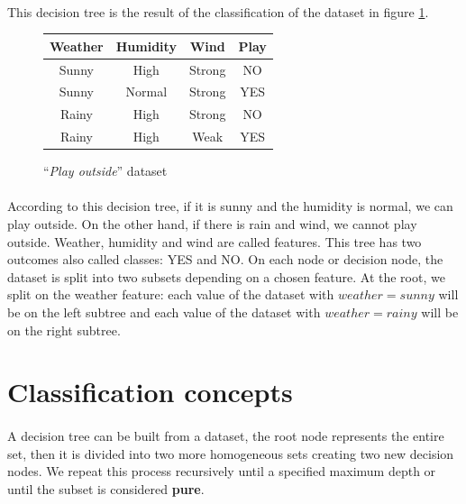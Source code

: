 \documentclass[12pt]{report}
\theoremstyle{definition}
\theoremstyle{definition}
\theoremstyle{definition}
\begin{document}
\paragraph{} This decision tree is the result of the classification of the dataset in figure
\ref{fig:dataweather}.

\begin{figure}[h]
    \centering
    \begin{tabular}{||c c c c||} 
    \hline
    Weather & Humidity & Wind & Play\\[0.5ex]
    \hline\hline
    Sunny & High & Strong & NO\\ 
    Sunny & Normal & Strong & YES\\
    Rainy & High & Strong & NO\\
    Rainy & High & Weak & YES\\ 
    \hline
    \end{tabular}
    \caption{``\textit{Play outside}'' dataset}
    \label{fig:dataweather}
\end{figure}

\paragraph{} According to this decision tree, if it is sunny and the humidity is normal, we can play outside.
On the other hand, if there is rain and wind, we cannot play outside. Weather, humidity and wind are called
features. This tree has two outcomes also called classes: YES and NO. On each node or decision node, the dataset
is split into two subsets depending on a chosen feature. At the root, we split on the weather feature: each
value of the dataset with $weather = sunny$ will be on the left subtree and each value of the dataset with
$weather = rainy$ will be on the right subtree.

\section{Classification concepts}
\paragraph{} A decision tree can be built from a dataset, the root node represents the entire set, then it is
divided into two more homogeneous sets creating two new decision nodes. We repeat this process recursively
until a specified maximum depth or until the subset is considered \textbf{pure}.
\end{document}
